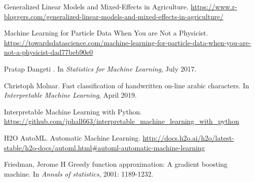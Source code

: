 \documentclass{article}
\begin{document}
\begin{thebibliography}{1}

\newblock Generalized Linear Models and Mixed-Effects in Agriculture.
\url{https://www.r-bloggers.com/generalized-linear-models-and-mixed-effects-in-agriculture/}

\newblock Machine Learning for Particle Data When You are Not a Physicist.
\url{https://towardsdatascience.com/machine-learning-for-particle-data-when-you-are-not-a-physicist-dad77beb90e0}

Pratap Dangeti .
\newblock  In {\em Statistics for Machine Learning}, July 2017.

Christoph Molnar.
\newblock Fast classification of handwritten on-line arabic characters.
\newblock In {\em Interpretable Machine Learning}, April 2019.

\newblock Interpretable Machine Learning with Python.
\url{https://github.com/jphall663/interpretable_machine_learning_with_python}

H2O AutoML.
\newblock Automatic Machine Learning.
\url{http://docs.h2o.ai/h2o/latest-stable/h2o-docs/automl.html#automl-automatic-machine-learning}

Friedman, Jerome H
\newblock Greedy function approximation: A gradient boosting machine.
\newblock In {\em Annals of statistics}, 2001: 1189-1232.

\end{thebibliography}

\pagebreak 

\appendix
\end{document}
